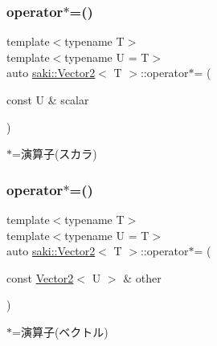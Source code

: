 \subsubsection{\texorpdfstring{operator$\ast$=()}{operator*=()}\hspace{0.1cm}{\footnotesize\ttfamily [1/2]}}
{\footnotesize\ttfamily template$<$typename T$>$ \\
template$<$typename U  = T$>$ \\
auto \mbox{\hyperlink{classsaki_1_1_vector2}{saki\+::\+Vector2}}$<$ T $>$\+::operator$\ast$= (\begin{DoxyParamCaption}\item[{const U \&}]{scalar }\end{DoxyParamCaption})\hspace{0.3cm}{\ttfamily [inline]}}



$\ast$=演算子(スカラ) 

\mbox{\label{classsaki_1_1_vector2_a31e1e9e5918b362e2559b453da787fbb}} 
\subsubsection{\texorpdfstring{operator$\ast$=()}{operator*=()}\hspace{0.1cm}{\footnotesize\ttfamily [2/2]}}
{\footnotesize\ttfamily template$<$typename T$>$ \\
template$<$typename U  = T$>$ \\
auto \mbox{\hyperlink{classsaki_1_1_vector2}{saki\+::\+Vector2}}$<$ T $>$\+::operator$\ast$= (\begin{DoxyParamCaption}\item[{const \mbox{\hyperlink{classsaki_1_1_vector2}{Vector2}}$<$ U $>$ \&}]{other }\end{DoxyParamCaption})\hspace{0.3cm}{\ttfamily [inline]}}



$\ast$=演算子(ベクトル) 

\mbox{\label{classsaki_1_1_vector2_a858afb6fe807d543ca5b266404226cd5}} 
